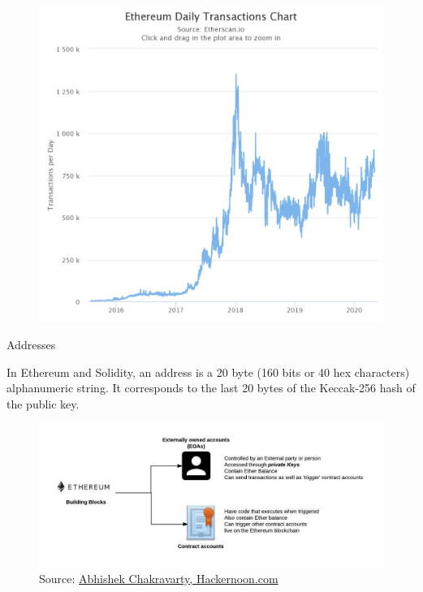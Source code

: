 \documentclass{beamer}
\begin{document}
\begin{frame}{}
    \begin{figure}
        \includegraphics[scale=0.235]{daily_txs_chart.png}
        \caption{}\label{fig:figure}
    \end{figure}
\end{frame}

\begin{frame}{Addresses}
    \begin{block}{}
        In Ethereum and Solidity, an address is a 20 byte (160 bits or 40 hex characters) alphanumeric string.
        It corresponds to the last 20 bytes of the Keccak-256 hash of the public key.
    \end{block}

    \begin{figure}
        \includegraphics[width=\textwidth]{types_of_addresses.jpeg}
        \caption{Source: \href{https://hackernoon.com/heres-how-i-built-a-private-blockchain-network-and-you-can-too-62ca7db556c0}{Abhishek Chakravarty, Hackernoon.com}}\label{fig:figure2}
    \end{figure}

\end{frame}
\end{document}

